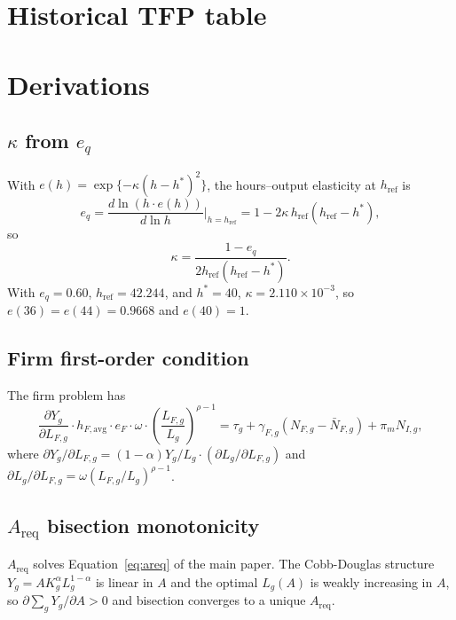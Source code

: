 \documentclass[12pt,a4paper]{article}
\begin{document}
\clearpage
\section{Historical TFP table}\label{app:tfp_history_table}



\clearpage
\section{Derivations}\label{app:derivations}

\subsection{$\kappa$ from $e_q$}\label{app:kappa_deriv}

With $e(h)=\exp\{-\kappa(h-h^*)^2\}$, the hours--output elasticity at $h_{\text{ref}}$ is
\[
e_q = \frac{d\ln(h\cdot e(h))}{d\ln h}\bigg|_{h=h_{\text{ref}}} = 1 - 2\kappa\,h_{\text{ref}}(h_{\text{ref}}-h^*),
\]
so
\begin{equation}\label{eq:kappa_derivation}
\kappa=\frac{1-e_q}{2 h_{\text{ref}}(h_{\text{ref}}-h^*)}.
\end{equation}
With $e_q=0.60$, $h_{\text{ref}}=42.244$, and $h^*=40$, $\kappa=2.110\times 10^{-3}$, so $e(36)=e(44)=0.9668$ and $e(40)=1$.

\subsection{Firm first-order condition}

The firm problem has
\begin{equation}\label{eq:foc_NF}
\frac{\partial Y_g}{\partial L_{F,g}}\cdot h_{F,\text{avg}}\cdot e_F\cdot\omega\cdot\left(\frac{L_{F,g}}{L_g}\right)^{\rho-1}=\tau_g+\gamma_{F,g}(N_{F,g}-\bar{N}_{F,g})+\pi_m N_{I,g},
\end{equation}
where $\partial Y_g/\partial L_{F,g}=(1-\alpha)Y_g/L_g\cdot(\partial L_g/\partial L_{F,g})$ and $\partial L_g/\partial L_{F,g}=\omega(L_{F,g}/L_g)^{\rho-1}$.

\subsection{$A_{\text{req}}$ bisection monotonicity}

$A_{\text{req}}$ solves Equation~\eqref{eq:areq} of the main paper. The Cobb-Douglas structure $Y_g=A K_g^\alpha L_g^{1-\alpha}$ is linear in $A$ and the optimal $L_g(A)$ is weakly increasing in $A$, so $\partial\sum_g Y_g/\partial A>0$ and bisection converges to a unique $A_{\text{req}}$.
\end{document}
